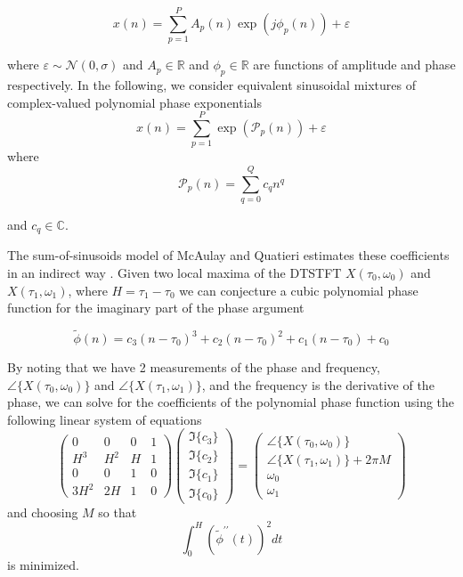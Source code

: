 \documentclass[letterpaper,12pt]{report}
\begin{document}
\begin{equation}
    x(n)=\sum_{p=1}^{P} A_p(n) \exp(j \phi_p(n)) + \varepsilon
\end{equation}

where $\varepsilon \sim \mathcal{N}(0,\sigma)$ and $A_p \in \mathbb{R}$ and
$\phi_p \in \mathbb{R}$ are functions of amplitude and phase respectively. In the
following, we consider equivalent sinusoidal mixtures of complex-valued
polynomial phase exponentials
\begin{equation}
    x(n)=\sum_{p=1}^{P} \exp(\mathcal{P}_p(n)) + \varepsilon
\end{equation}
where
\begin{equation}
    \mathcal{P}_p(n) = \sum_{q=0}^{Q} c_q n^{q}
\end{equation}

and $c_q \in \mathbb{C}$.

The sum-of-sinusoids model of McAulay and Quatieri estimates these coefficients
in an indirect way \cite{mcaulay1986speech}. Given two local maxima of the
DTSTFT $X(\tau_0,\omega_0)$ and $X(\tau_1,\omega_1)$, where $H = \tau_1 -
\tau_0$ we can conjecture a cubic
polynomial phase function for the imaginary part of the phase argument

\begin{equation}
    \tilde{\phi}(n) = c_3 (n-\tau_0)^3 + c_2 (n-\tau_0)^2 + c_1 (n-\tau_0) + c_0
\end{equation}

By noting that we have 2 measurements of the phase and frequency,
$\angle\{X(\tau_0,\omega_0)\}$ and $\angle\{X(\tau_1,\omega_1)\}$, and the frequency
is the derivative of the phase, we can solve for the coefficients of the
polynomial phase function using the following linear system of equations
\begin{equation}
    \begin{pmatrix}
        0   & 0     & 0 & 1 \\
        H^3 & H^2   & H & 1 \\
        0   & 0     & 1 & 0 \\
        3 H^2 & 2 H & 1 & 0
    \end{pmatrix}
    \begin{pmatrix}
        \Im\{c_3\} \\
        \Im\{c_2\} \\
        \Im\{c_1\} \\
        \Im\{c_0\}
    \end{pmatrix}
    =
    \begin{pmatrix}
        \angle\{X(\tau_0,\omega_0)\} \\
        \angle\{X(\tau_1,\omega_1)\} + 2 \pi M \\
        \omega_0 \\
        \omega_1        
    \end{pmatrix}
\end{equation}
and choosing $M$ so that
\begin{equation}
    \int_{0}^{H}(\tilde{\phi}^{\prime\prime}(t))^{2}dt
\end{equation}
is minimized.
\end{document}
